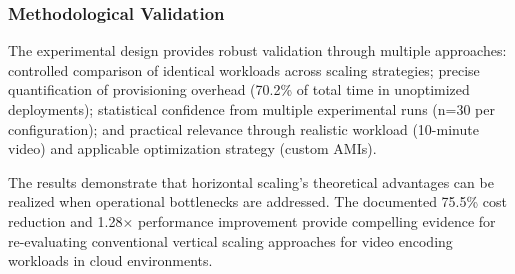 \documentclass[conference]{IEEEtran}
\begin{document}
	\subsubsection{Methodological Validation}
	
	The experimental design provides robust validation through multiple approaches: controlled comparison of identical workloads across scaling strategies; precise quantification of provisioning overhead (70.2\% of total time in unoptimized deployments); statistical confidence from multiple experimental runs (n=30 per configuration); and practical relevance through realistic workload (10-minute video) and applicable optimization strategy (custom AMIs).
	
	The results demonstrate that horizontal scaling's theoretical advantages can be realized when operational bottlenecks are addressed. The documented 75.5\% cost reduction and 1.28× performance improvement provide compelling evidence for re-evaluating conventional vertical scaling approaches for video encoding workloads in cloud environments.
	
	
	
	
	
	
	
	
	
	
	
	
	
	
	
	
	
	
	
	
	
\end{document}
